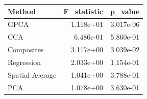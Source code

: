\begin{tabular}{lrr}
\toprule
Method & F_statistic & p_value \\
\midrule
GPCA & 1.118e+01 & 3.017e-06 \\
CCA & 6.486e-01 & 5.860e-01 \\
Composites & 3.117e+00 & 3.039e-02 \\
Regression & 2.033e+00 & 1.154e-01 \\
Spatial Average & 1.041e+00 & 3.788e-01 \\
PCA & 1.078e+00 & 3.630e-01 \\
\bottomrule
\end{tabular}
